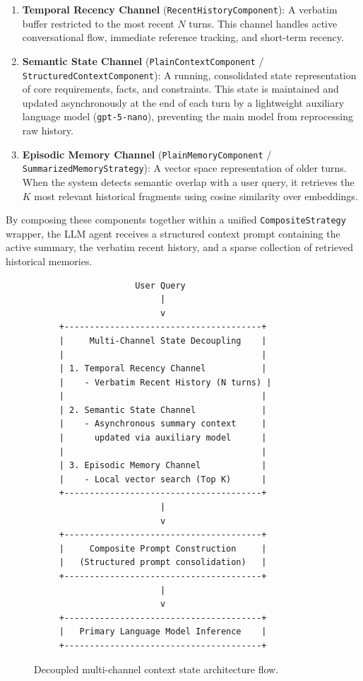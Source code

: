 \documentclass[11pt,journal,onecolumn]{article}
\begin{document}
\begin{enumerate}
    \item \textbf{Temporal Recency Channel} (\texttt{RecentHistoryComponent}): A verbatim buffer restricted to the most recent $N$ turns. This channel handles active conversational flow, immediate reference tracking, and short-term recency.
    \item \textbf{Semantic State Channel} (\texttt{PlainContextComponent} / \texttt{StructuredContextComponent}): A running, consolidated state representation of core requirements, facts, and constraints. This state is maintained and updated asynchronously at the end of each turn by a lightweight auxiliary language model (\texttt{gpt-5-nano}), preventing the main model from reprocessing raw history.
    \item \textbf{Episodic Memory Channel} (\texttt{PlainMemoryComponent} / \texttt{SummarizedMemoryStrategy}): A vector space representation of older turns. When the system detects semantic overlap with a user query, it retrieves the $K$ most relevant historical fragments using cosine similarity over embeddings.
\end{enumerate}

By composing these components together within a unified \texttt{CompositeStrategy} wrapper, the LLM agent receives a structured context prompt containing the active summary, the verbatim recent history, and a sparse collection of retrieved historical memories.

\begin{figure}[htbp]
\centering
\small
\begin{verbatim}
                    User Query
                         |
                         v
     +---------------------------------------+
     |     Multi-Channel State Decoupling    |
     |                                       |
     | 1. Temporal Recency Channel           |
     |    - Verbatim Recent History (N turns) |
     |                                       |
     | 2. Semantic State Channel             |
     |    - Asynchronous summary context     |
     |      updated via auxiliary model      |
     |                                       |
     | 3. Episodic Memory Channel            |
     |    - Local vector search (Top K)      |
     +---------------------------------------+
                         |
                         v
     +---------------------------------------+
     |     Composite Prompt Construction     |
     |   (Structured prompt consolidation)   |
     +---------------------------------------+
                         |
                         v
     +---------------------------------------+
     |   Primary Language Model Inference    |
     +---------------------------------------+
\end{verbatim}
\caption{Decoupled multi-channel context state architecture flow.}
\label{fig:architecture}
\end{figure}
\end{document}
